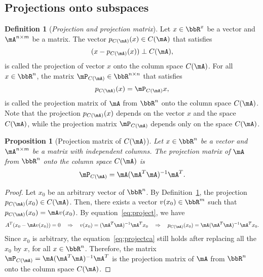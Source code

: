\documentclass[11pt]{article}
\theoremstyle{plain}
\newtheorem{prop}{Proposition}
\theoremstyle{definition}
\newtheorem{defn}{Definition}
\begin{document}
\subsection{Projections onto subspaces}
\begin{defn}[\textit{Projection and projection matrix}]\label{def:project} Let  $x \in \bbR^{x}$ be a vector and $\mA^{n \times m}$ be a matrix. The vector $p_{C(\mA)}(x) \in C(\mA)$ that satisfies
	\begin{equation}\label{eq:project}
		(x-p_{C(\mA)}(x)) \perp C(\mA),
	\end{equation} 
	is called the projection of vector $x$ onto the column space $C(\mA)$. For all $x \in \bbR^n$, the matrix  $\mP_{C(\mA)} \in \bbR^{n \times n}$  that satisfies	\begin{equation}
		p_{C(\mA)}(x) =\mP_{C(\mA)} x,
	\end{equation}
	is called the projection matrix of $\mA$ from $\bbR^n$ onto the column space  $C(\mA)$. Note that the projection $p_{C(\mA)}(x)$ depends on the vector $x$ and the space $C(\mA)$, while the projection matrix $\mP_{C(\mA)}$ depends only on the space $C(\mA)$. 
\end{defn}

\begin{prop}[Projection matrix of $C(\mA)$]\label{prop:project}
	Let  $x \in \bbR^{n}$ be a vector and $\mA^{n \times m}$ be a matrix with independent columns. The projection matrix of $\mA$ from $\bbR^n$ onto the column space  $C(\mA)$ is 
	\begin{equation}
		\mP_{C(\mA)} =  \mA (\mA^T \mA)^{-1} \mA^T.
	\end{equation}
\end{prop}

\begin{proof}
Let $x_0$ be an arbitrary vector of $\bbR^n$. By Definition~\ref{def:project}, the projection $p_{C(\mA)}(x_0) \in C(\mA)$. Then, there exists a vector $v(x_0) \in \bbR^m$ such that $p_{C(\mA)}(x_0) = \mA  v(x_0)$.  By equation~\eqref{eq:project}, we have 
\begin{equation}\label{eq:projectca}
	A^T (x_0 - \mA v(x_0)) = 0 \quad \Rightarrow  \quad v(x_0) = (\mA^T \mA)^{-1} \mA^T x_0 \quad \Rightarrow \quad p_{C(\mA)}(x_0)  = \mA (\mA^T \mA)^{-1} \mA^T  x_0. 
\end{equation}
Since $x_0$ is arbitrary, the equation~\eqref{eq:projectca} still holds after replacing all the $x_0$ by $x$, for all $x \in \bbR^n$. Therefore, the matrix $\mP_{C(\mA)} =  \mA (\mA^T \mA)^{-1} \mA^T$ is the projection matrix of $\mA$ from $\bbR^n$ onto the column space $C(\mA)$.
\end{proof}
 
\end{document}
